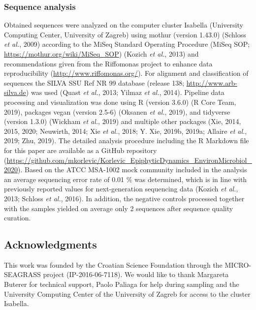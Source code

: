 \documentclass[12pt,]{article}
\begin{document}
\hypertarget{sequence-analysis}{%
\subsubsection{Sequence analysis}\label{sequence-analysis}}

Obtained sequences were analyzed on the computer cluster Isabella
(University Computing Center, University of Zagreb) using mothur
(version 1.43.0) (Schloss \emph{et al.}, 2009) according to the MiSeq
Standard Operating Procedure (MiSeq SOP;
\url{https://mothur.org/wiki/MiSeq_SOP}) (Kozich \emph{et al.}, 2013)
and recommendations given from the Riffomonas project to enhance data
reproducibility (\url{http://www.riffomonas.org/}). For alignment and
classification of sequences the SILVA SSU Ref NR 99 database (release
138; \url{http://www.arb-silva.de}) was used (Quast \emph{et al.}, 2013;
Yilmaz \emph{et al.}, 2014). Pipeline data processing and visualization
was done using R (version 3.6.0) (R Core Team, 2019), packages vegan
(version 2.5-6) (Oksanen \emph{et al.}, 2019), and tidyverse (version
1.3.0) (Wickham \emph{et al.}, 2019) and multiple other packages (Xie,
2014, 2015, 2020; Neuwirth, 2014; Xie \emph{et al.}, 2018; Y. Xie,
2019b, 2019a; Allaire \emph{et al.}, 2019; Zhu, 2019). The detailed
analysis procedure including the R Markdown file for this paper are
available as a GitHub repository
(\url{https://github.com/mkorlevic/Korlevic_EpiphyticDynamics_EnvironMicrobiol_2020}).
Based on the ATCC MSA-1002 mock community included in the analysis an
average sequencing error rate of 0.01 \si{\percent} was determined,
which is in line with previously reported values for next-generation
sequencing data (Kozich \emph{et al.}, 2013; Schloss \emph{et al.},
2016). In addition, the negative controls processed together with the
samples yielded on average only 2 sequences after sequence quality
curation.

\hypertarget{acknowledgments}{%
\subsection{Acknowledgments}\label{acknowledgments}}

This work was founded by the Croatian Science Foundation through the
MICRO-SEAGRASS project (IP-2016-06-7118). We would like to thank
Margareta Buterer for technical support, Paolo Paliaga for help during
sampling and the University Computing Center of the University of Zagreb
for access to the cluster Isabella.

\newpage
\end{document}
